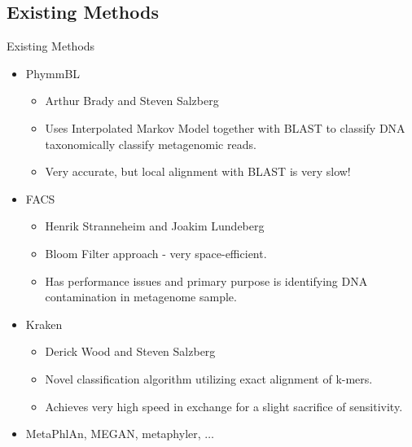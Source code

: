 \documentclass[xcolor=x11names,compress]{beamer}
\renewcommand{\(}{\begin{columns}}
\renewcommand{\)}{\end{columns}}
\newcommand{\<}[1]{\begin{column}{#1}}
\renewcommand{\>}{\end{column}}
\begin{document}
\subsection{Existing Methods}
\begin{frame}{Existing Methods}
\begin{itemize}
	\item PhymmBL
		\begin{itemize}
			\item Arthur Brady and Steven Salzberg 
			\item Uses Interpolated Markov Model together with BLAST to classify DNA taxonomically classify metagenomic reads.
			\item Very accurate, but local alignment with BLAST is very slow!
		\end{itemize}
	\item FACS
	\begin{itemize}
			\item Henrik Stranneheim and Joakim  Lundeberg
			\item Bloom Filter approach - very space-efficient.
			\item Has performance issues and primary purpose is identifying DNA contamination in metagenome sample.
		\end{itemize}
	\item Kraken
		\begin{itemize}
			\item Derick Wood and Steven Salzberg
			\item Novel classification algorithm utilizing exact alignment of k-mers.
			\item Achieves very high speed in exchange for a slight sacrifice of sensitivity.
		\end{itemize}
		\item MetaPhlAn, MEGAN, metaphyler, $\ldots$
	\end{itemize}
\end{frame}
\end{document}
